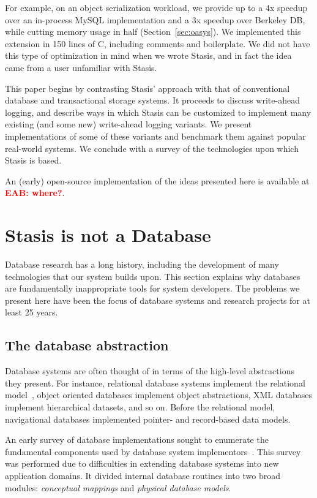 \documentclass[letterpaper,twocolumn,10pt]{article}
\newcommand{\yad}{Stasis\xspace}
\newcommand{\yads}{Stasis'\xspace}
\newcommand{\eab}[1]{\textcolor{red}{\bf EAB: #1}}
\begin{document}
For example, on an object serialization workload, we provide up to 
a 4x speedup over an in-process MySQL implementation and a 3x speedup over Berkeley DB, while 
cutting memory usage in half (Section~\ref{sec:oasys}). 
We implemented this extension in 150 lines of C, including comments and boilerplate.  We did not have this type of optimization
in mind when we wrote \yad, and in fact the idea came from a
user unfamiliar with \yad.


This paper begins by contrasting \yads approach with that of
conventional database and transactional storage systems.  It proceeds
to discuss write-ahead logging, and describe ways in which \yad can be
customized to implement many existing (and some new) write-ahead
logging variants.  We present implementations of some of these variants and
benchmark them against popular real-world systems.  We
conclude with a survey of the technologies upon which \yad is based.

An (early) open-source implementation of
the ideas presented here is available at \eab{where?}.

\section{\yad is not a Database}
\label{sec:notDB}
Database research has a long history, including the development of
many technologies that our system builds upon.  This section explains
why databases are fundamentally inappropriate tools for system
developers.  The problems we present here have been the focus of
database systems and research projects for at least 25 years.

\subsection{The database abstraction}

Database systems are often thought of in terms of the high-level
abstractions they present.  For instance, relational database systems
implement the relational model~\cite{codd}, object oriented
databases implement object abstractions, XML databases implement
hierarchical datasets, and so on.  Before the relational model,
navigational databases implemented pointer- and record-based data models.

An early survey of database implementations sought to enumerate the
fundamental components used by database system implementors~\cite{batoryConceptual,batoryPhysical}.  This
survey was performed due to difficulties in extending database systems
into new application domains.  It divided internal database
routines into two broad modules: {\em conceptual mappings} and {\em physical
database models}.
\end{document}
